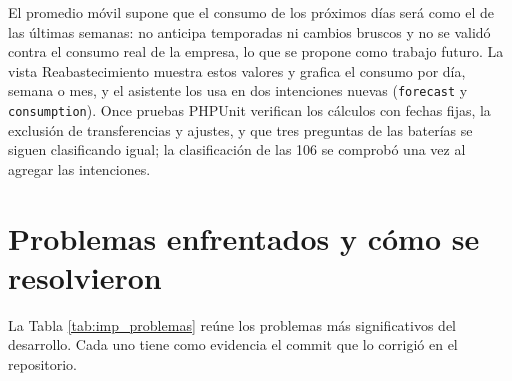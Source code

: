 El promedio móvil supone que el consumo de los próximos días será como el de las últimas semanas: no anticipa temporadas ni cambios bruscos y no se validó contra el consumo real de la empresa, lo que se propone como trabajo futuro. La vista Reabastecimiento muestra estos valores y grafica el consumo por día, semana o mes, y el asistente los usa en dos intenciones nuevas (\texttt{forecast} y \texttt{consumption}). Once pruebas PHPUnit verifican los cálculos con fechas fijas, la exclusión de transferencias y ajustes, y que tres preguntas de las baterías se siguen clasificando igual; la clasificación de las 106 se comprobó una vez al agregar las intenciones.

\section{Problemas enfrentados y cómo se resolvieron}
\label{sec:imp_problemas}

La Tabla \ref{tab:imp_problemas} reúne los problemas más significativos del desarrollo. Cada uno tiene como evidencia el commit que lo corrigió en el repositorio.

